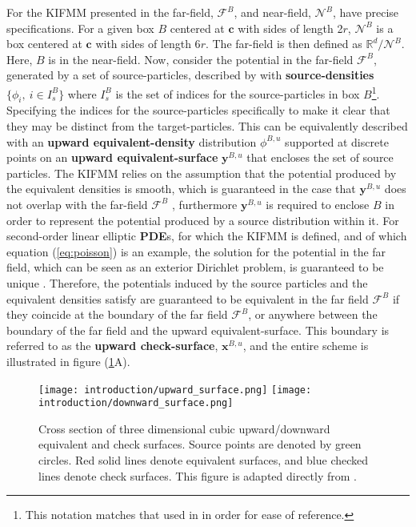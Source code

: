 For the \gls{KIFMM} presented in \cite{Ying:2004:JCP} the \gls{far-field}, $\mathcal{F}^B$, and
\gls{near-field}, $\mathcal{N}^B$, have precise specifications. For a given box $B$
centered at $\mathbf{c}$ with sides of length 2$r$, $\mathcal{N}^B$ is a box
centered at $\mathbf{c}$ with sides of length 6$r$. The \gls{far-field} is then
defined as $\mathbb{R}^d / \mathcal{N}^B$. Here, $B$ is in the \gls{near-field}. Now,
consider the potential in the \gls{far-field} $\mathcal{F}^B$, generated by a
set of \gls{source-particles}, described by with \textbf{\gls{source-densities}}
$\{\phi_i, \> i \in I^B_s \}$ where $I^B_s$ is the set of indices for the \gls{source-particles}
in box $B$\footnote{This notation matches that used in \cite{Ying:2004:JCP}
in order for ease of reference.}. Specifying the indices for the \gls{source-particles}
specifically to make it clear that they may be distinct from the \gls{target-particles}.
This can be equivalently described with an \textbf{upward \gls{equivalent-density}}
distribution $\phi^{B,u}$ supported at discrete points on an \textbf{upward \gls{equivalent-surface}}
$\mathbf{y}^{B, u}$ that encloses the set of source particles. The KIFMM relies
on the assumption that the potential produced by the equivalent densities is smooth,
which is guaranteed in the case that $\mathbf{y}^{B,u}$ does not overlap with the
far-field $\mathcal{F}^B$ \cite{Ying:2004:JCP}, furthermore $\mathbf{y}^{B,u}$
is required to enclose $B$ in order to represent the potential produced by
a source distribution within it. For second-order linear elliptic \textbf{\gls{PDE}}s, for which the KIFMM is defined,
and of which equation (\ref{eq:poisson}) is an example, the solution for the
potential in the far field, which can be seen as an exterior Dirichlet problem,
is guaranteed to be unique \cite{Ying:2004:JCP}. Therefore, the potentials
induced by the source particles and the equivalent densities satisfy are
guaranteed to be equivalent in the far field $\mathcal{F}^B$ if they coincide
at the boundary of the far field $\mathcal{F}^B$, or anywhere between the boundary
of the far field and the upward \gls{equivalent-surface}. This boundary is referred to
as the \textbf{upward \gls{check-surface}}, $\mathbf{x}^{B, u}$, and the entire scheme is illustrated in
figure (\ref{fig:1_2_upward_downward_surfaces}A).

\begin{figure}[!h]
    \centering
    {\texttt{[image: introduction/upward\_surface.png]}}
    \hfill
  {\texttt{[image: introduction/downward\_surface.png]}}
  \vspace{0pt}
  \caption{Cross section of three dimensional cubic upward/downward equivalent and
    check surfaces. Source points are denoted by green circles. Red solid lines
    denote equivalent surfaces, and blue checked lines denote check surfaces. This
    figure is adapted directly from \cite{Ying:2004:JCP}.}
  \label{fig:1_2_upward_downward_surfaces}
\end{figure}

